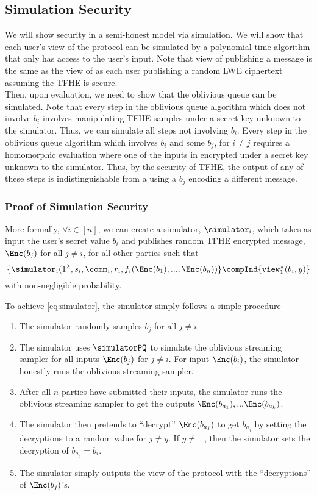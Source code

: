 \subsection{Simulation Security}
We will show security in a semi-honest model via simulation. We will show that each user's view of the protocol can be simulated by a polynomial-time algorithm that only has access to the user's input.
Note that view of publishing a message is the same as the view of as each user publishing a random LWE ciphertext assuming the TFHE is secure.
\\Then, upon evaluation, we need to show that the oblivious queue can be simulated.
Note that every step in the oblivious queue algorithm which does not involve $b_i$ involves manipulating
TFHE samples under a secret key unknown to the simulator. Thus, we can simulate all steps not involving $b_i$.
Every step in the oblivious queue algorithm which involves $b_i$ and some $b_j$, for $i \neq j$ requires 
a homomorphic evaluation where one of the inputs in encrypted under a secret key unknown to the simulator.
Thus, by the security of TFHE, the output of any of these steps is indistinguishable from a using a $b_j$ encoding a different message.

\subsubsection*{Proof of Simulation Security}
More formally, $\forall i \in [n]$, we can create a simulator, $\simulator_i$, which takes as input 
the user's secret value $b_i$ and publishes random TFHE encrypted message, $\Enc(b_j)$ for all $j \neq i$, for all other parties such that
\begin{equation}
	\label{eq:simulator}
	\{\simulator_i(1^\lambda, s_i, \comm_i, r_i, f_i(\Enc(b_1), ..., \Enc(b_n))\} \compInd \{\texttt{view}^\pi_1(b_i, y)\} 
\end{equation}
with non-negligible probability.

To achieve \cref{eq:simulator}, the simulator simply follows a simple procedure
\begin{enumerate}
	\item The simulator randomly samples $b_j$ for all $j \neq i$
	\item The simulator uses $\simulatorPQ$ to simulate the oblivious streaming sampler for all inputs $\Enc(b_j)$ for $j \neq i$.
	For input $\Enc(b_i)$, the simulator honestly runs the oblivious streaming sampler.
	\item After all $n$ parties have submitted their inputs, the simulator runs the oblivious streaming sampler to get the outputs $\Enc(b_{a_1}),... \Enc(b_{a_k})$.
	\item The simulator then pretends to ``decrypt'' $\Enc(b_{a_j})$ to get $b_{a_j}$ by setting the decryptions to a random value
	for $j \neq y$. If $y \neq \bot$, then the simulator sets the decryption of $b_{a_y} = b_i$.
	\item The simulator simply outputs the view of the protocol with the ``decryptions'' of $\Enc(b_j)$'s.
\end{enumerate}

